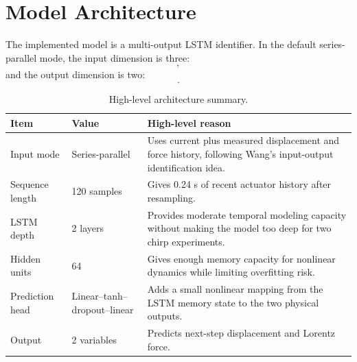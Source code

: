 \documentclass[11pt]{article}
\begin{document}
\section{Model Architecture}
The implemented model is a multi-output LSTM identifier. In the default series-parallel mode, the input dimension is three:
\begin{equation}
[I(k),x(k),F(k)],
\end{equation}
and the output dimension is two:
\begin{equation}
[\hat{x}(k+1),\hat{F}(k+1)].
\end{equation}

\begin{table}[H]
\centering
\small
\begin{tabular}{p{4cm}p{3cm}p{7cm}}
\toprule
Item & Value & High-level reason \\
\midrule
Input mode & Series-parallel & Uses current plus measured displacement and force history, following Wang's input-output identification idea. \\
Sequence length & 120 samples & Gives 0.24 s of recent actuator history after resampling. \\
LSTM depth & 2 layers & Provides moderate temporal modeling capacity without making the model too deep for two chirp experiments. \\
Hidden units & 64 & Gives enough memory capacity for nonlinear dynamics while limiting overfitting risk. \\
Prediction head & Linear--tanh--dropout--linear & Adds a small nonlinear mapping from the LSTM memory state to the two physical outputs. \\
Output & 2 variables & Predicts next-step displacement and Lorentz force. \\
\bottomrule
\end{tabular}
\caption{High-level architecture summary.}
\label{tab:arch_summary}
\end{table}
\end{document}
